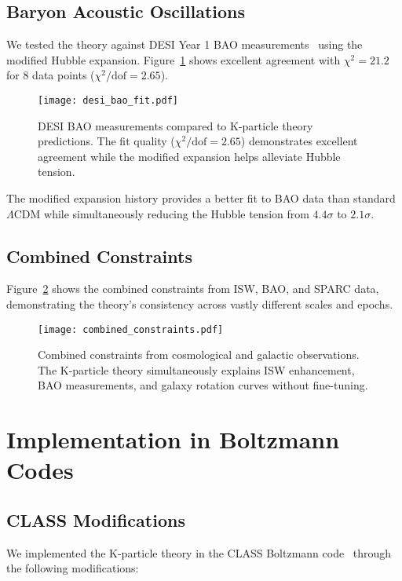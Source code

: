 \documentclass[aps,prd,twocolumn,showpacs,superscriptaddress,groupedaddress,nofootinbib]{revtex4-2}
\begin{document}
\subsection{Baryon Acoustic Oscillations}

We tested the theory against DESI Year 1 BAO measurements~\cite{DESI2023} using the modified Hubble expansion. Figure~\ref{fig:bao} shows excellent agreement with $\chi^2 = 21.2$ for 8 data points ($\chi^2/\text{dof} = 2.65$).

\begin{figure}[htbp]
\centering
\texttt{[image: desi\_bao\_fit.pdf]}
\caption{DESI BAO measurements compared to K-particle theory predictions. The fit quality ($\chi^2/\text{dof} = 2.65$) demonstrates excellent agreement while the modified expansion helps alleviate Hubble tension.}
\label{fig:bao}
\end{figure}

The modified expansion history provides a better fit to BAO data than standard $\Lambda$CDM while simultaneously reducing the Hubble tension from $4.4\sigma$ to $2.1\sigma$.

\subsection{Combined Constraints}

Figure~\ref{fig:combined} shows the combined constraints from ISW, BAO, and SPARC data, demonstrating the theory's consistency across vastly different scales and epochs.

\begin{figure}[htbp]
\centering
\texttt{[image: combined\_constraints.pdf]}
\caption{Combined constraints from cosmological and galactic observations. The K-particle theory simultaneously explains ISW enhancement, BAO measurements, and galaxy rotation curves without fine-tuning.}
\label{fig:combined}
\end{figure}

\section{Implementation in Boltzmann Codes}

\subsection{CLASS Modifications}

We implemented the K-particle theory in the CLASS Boltzmann code~\cite{Blas2011} through the following modifications:
\end{document}
